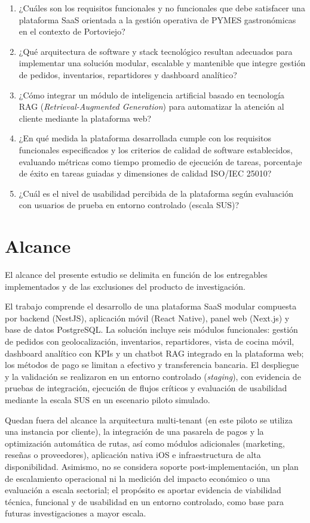 \begin{enumerate}
    \item ¿Cuáles son los requisitos funcionales y no funcionales que debe satisfacer una plataforma SaaS orientada a la gestión operativa de PYMES gastronómicas en el contexto de Portoviejo?
    \item ¿Qué arquitectura de software y stack tecnológico resultan adecuados para implementar una solución modular, escalable y mantenible que integre gestión de pedidos, inventarios, repartidores y dashboard analítico?
    \item ¿Cómo integrar un módulo de inteligencia artificial basado en tecnología RAG (\textit{Retrieval-Augmented Generation}) para automatizar la atención al cliente mediante la plataforma web?
    \item ¿En qué medida la plataforma desarrollada cumple con los requisitos funcionales especificados y los criterios de calidad de software establecidos, evaluando métricas como tiempo promedio de ejecución de tareas, porcentaje de éxito en tareas guiadas y dimensiones de calidad ISO/IEC 25010?
    \item ¿Cuál es el nivel de usabilidad percibida de la plataforma según evaluación con usuarios de prueba en entorno controlado (escala SUS)?
\end{enumerate}



\section{Alcance}

El alcance del presente estudio se delimita en función de los entregables implementados y de las exclusiones del producto de investigación.

El trabajo comprende el desarrollo de una plataforma SaaS modular compuesta por backend (NestJS), aplicación móvil (React Native), panel web (Next.js) y base de datos PostgreSQL. La solución incluye seis módulos funcionales: gestión de pedidos con geolocalización, inventarios, repartidores, vista de cocina móvil, dashboard analítico con KPIs y un chatbot RAG integrado en la plataforma web; los métodos de pago se limitan a efectivo y transferencia bancaria. El despliegue y la validación se realizaron en un entorno controlado (\textit{staging}), con evidencia de pruebas de integración, ejecución de flujos críticos y evaluación de usabilidad mediante la escala SUS en un escenario piloto simulado.

Quedan fuera del alcance la arquitectura multi-tenant (en este piloto se utiliza una instancia por cliente), la integración de una pasarela de pagos y la optimización automática de rutas, así como módulos adicionales (marketing, reseñas o proveedores), aplicación nativa iOS e infraestructura de alta disponibilidad. Asimismo, no se considera soporte post-implementación, un plan de escalamiento operacional ni la medición del impacto económico o una evaluación a escala sectorial; el propósito es aportar evidencia de viabilidad técnica, funcional y de usabilidad en un entorno controlado, como base para futuras investigaciones a mayor escala.

